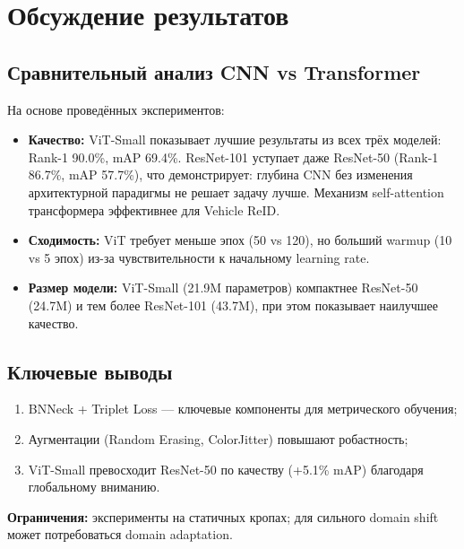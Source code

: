 \section{Обсуждение результатов}

\subsection{Сравнительный анализ CNN vs Transformer}

На основе проведённых экспериментов:

\begin{itemize}
  \item \textbf{Качество:} ViT-Small показывает лучшие результаты из всех трёх моделей: Rank-1 90.0\%, mAP 69.4\%. ResNet-101 уступает даже ResNet-50 (Rank-1 86.7\%, mAP 57.7\%), что демонстрирует: глубина CNN без изменения архитектурной парадигмы не решает задачу лучше. Механизм self-attention трансформера эффективнее для Vehicle ReID.
  \item \textbf{Сходимость:} ViT требует меньше эпох (50 vs 120), но больший warmup (10 vs 5 эпох) из-за чувствительности к начальному learning rate.
  \item \textbf{Размер модели:} ViT-Small (21.9M параметров) компактнее ResNet-50 (24.7M) и тем более ResNet-101 (43.7M), при этом показывает наилучшее качество.
\end{itemize}

\subsection{Ключевые выводы}
\begin{enumerate}
  \item BNNeck + Triplet Loss — ключевые компоненты для метрического обучения;
  \item Аугментации (Random Erasing, ColorJitter) повышают робастность;
  \item ViT-Small превосходит ResNet-50 по качеству (+5.1\% mAP) благодаря глобальному вниманию.
\end{enumerate}

\textbf{Ограничения:} эксперименты на статичных кропах; для сильного domain shift может потребоваться domain adaptation.

